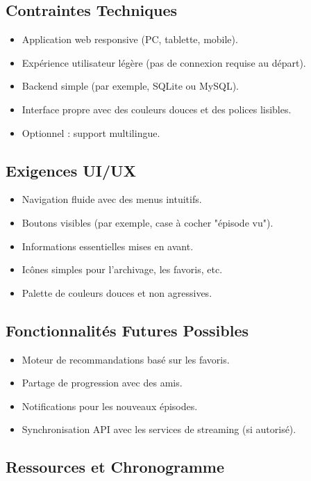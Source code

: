 \subsection{Contraintes Techniques}
\begin{itemize}
    \item Application web responsive (PC, tablette, mobile).
    \item Expérience utilisateur légère (pas de connexion requise au départ).
    \item Backend simple (par exemple, SQLite ou MySQL).
    \item Interface propre avec des couleurs douces et des polices lisibles.
    \item Optionnel : support multilingue.
\end{itemize}

\subsection{Exigences UI/UX}
\begin{itemize}
    \item Navigation fluide avec des menus intuitifs.
    \item Boutons visibles (par exemple, case à cocher "épisode vu").
    \item Informations essentielles mises en avant.
    \item Icônes simples pour l'archivage, les favoris, etc.
    \item Palette de couleurs douces et non agressives.
\end{itemize}

\subsection{Fonctionnalités Futures Possibles}
\begin{itemize}
    \item Moteur de recommandations basé sur les favoris.
    \item Partage de progression avec des amis.
    \item Notifications pour les nouveaux épisodes.
    \item Synchronisation API avec les services de streaming (si autorisé).
\end{itemize}

\subsection{Ressources et Chronogramme}

